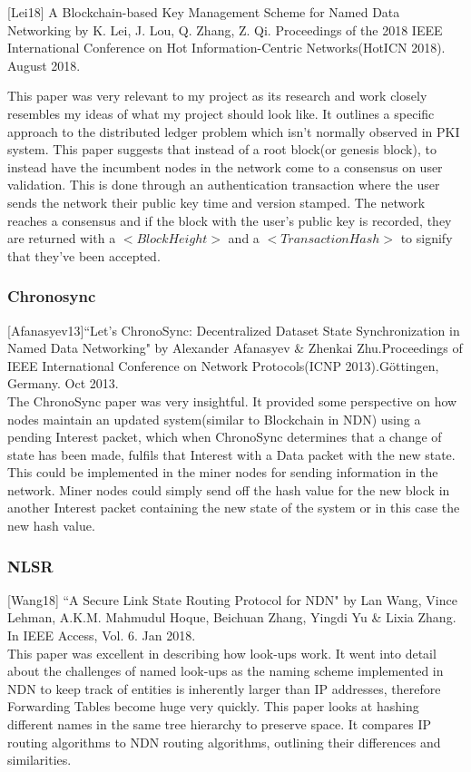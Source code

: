 [Lei18] A Blockchain-based Key Management Scheme for Named Data Networking by K. Lei, J. Lou, Q. Zhang, Z. Qi. Proceedings of the  2018 IEEE International Conference on Hot Information-Centric Networks(HotICN 2018). August 2018.

This paper was very relevant to my project as its research and work closely resembles my ideas of what my project should look like. It outlines a specific approach to the distributed ledger problem which isn't normally observed in PKI system. This paper suggests that instead of a root block(or genesis block), to instead have the incumbent nodes in the network come to a consensus on user validation. This is done through an authentication transaction where the user sends the network their public key time and version stamped. The network reaches a consensus and if the block with the user's public key is recorded, they are returned with a ${<}Block Height{>}$ and a ${<}Transaction Hash{>}$ to signify that they've been accepted.
\subsubsection{Chronosync}
[Afanasyev13]``Let's ChronoSync: Decentralized Dataset State
Synchronization in Named Data Networking" by Alexander Afanasyev \& Zhenkai Zhu.Proceedings of  IEEE International Conference on Network Protocols(ICNP 2013).Göttingen, Germany. Oct 2013.\\

The ChronoSync paper was very insightful. It provided some perspective on how nodes maintain an updated system(similar to Blockchain in NDN) using a pending Interest packet, which when ChronoSync determines that a change of state has been made, fulfils that Interest with a Data packet with the new state. This could be implemented in the miner nodes for sending information in the network. Miner nodes could simply send off the hash value for the new block in another Interest packet containing the new state of the system or in this case the new hash value.

\subsubsection{NLSR}
[Wang18] ``A Secure Link State Routing Protocol for NDN" by Lan Wang, Vince Lehman, A.K.M. Mahmudul Hoque, Beichuan Zhang, Yingdi Yu \& Lixia Zhang. In IEEE Access, Vol. 6. Jan 2018.\\

This paper was excellent in describing how look-ups work. It went into detail about the challenges of named look-ups as the naming scheme implemented in NDN to keep track of entities is inherently larger than IP addresses, therefore Forwarding Tables become huge very quickly. This paper looks at hashing different names in the same tree hierarchy to preserve space. It compares IP routing algorithms to NDN routing algorithms, outlining their differences and similarities.
